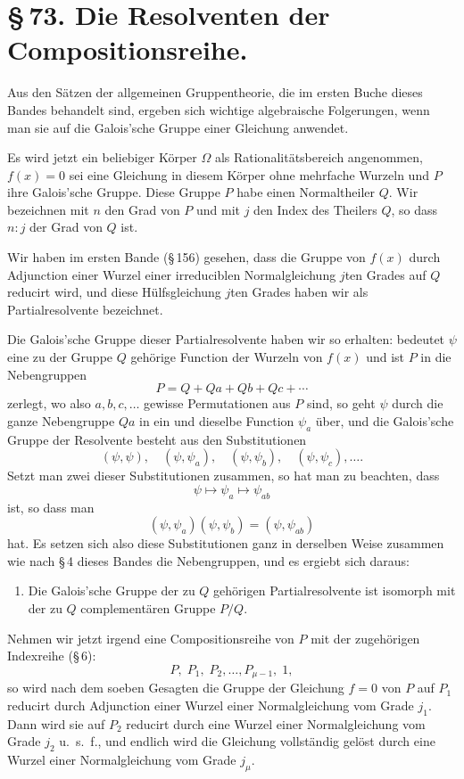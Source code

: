 \documentclass[11pt]{article}
\begin{document}
\section*{\S\,73. Die Resolventen der Compositionsreihe.}

Aus den Sätzen der allgemeinen Gruppentheorie, die im ersten Buche dieses Bandes behandelt sind, ergeben sich wichtige algebraische Folgerungen, wenn man sie auf die Galois'sche Gruppe einer Gleichung anwendet.

Es wird jetzt ein beliebiger Körper $\Omega$ als Rationalitätsbereich angenommen, $f(x)=0$ sei eine Gleichung in diesem Körper ohne mehrfache Wurzeln und $P$ ihre Galois'sche Gruppe. Diese Gruppe $P$ habe einen Normaltheiler $Q$. Wir bezeichnen mit $n$ den Grad von $P$ und mit $j$ den Index des Theilers $Q$, so dass $n:j$ der Grad von $Q$ ist.

Wir haben im ersten Bande (\S\,156) gesehen, dass die Gruppe von $f(x)$ durch Adjunction einer Wurzel einer irreduciblen Normalgleichung $j$ten Grades auf $Q$ reducirt wird, und diese Hülfsgleichung $j$ten Grades haben wir als Partialresolvente bezeichnet.

Die Galois'sche Gruppe dieser Partialresolvente haben wir so erhalten: bedeutet $\psi$ eine zu der Gruppe $Q$ gehörige Function der Wurzeln von $f(x)$ und ist $P$ in die Nebengruppen
\[
  P=Q+Qa+Qb+Qc+\cdots
\]
zerlegt, wo also $a,b,c,\ldots$ gewisse Permutationen aus $P$ sind, so geht $\psi$ durch die ganze Nebengruppe $Qa$ in ein und dieselbe Function $\psi_a$ über, und die Galois'sche Gruppe der Resolvente besteht aus den Substitutionen
\[
  (\psi,\psi),\quad(\psi,\psi_a),\quad(\psi,\psi_b),\quad(\psi,\psi_c),\ldots .
\]
Setzt man zwei dieser Substitutionen zusammen, so hat man zu beachten, dass
\[
  \psi\longmapsto \psi_a\longmapsto \psi_{ab}
\]
ist, so dass man
\[
  (\psi,\psi_a)(\psi,\psi_b)=(\psi,\psi_{ab})
\]
hat. Es setzen sich also diese Substitutionen ganz in derselben Weise zusammen wie nach \S\,4 dieses Bandes die Nebengruppen, und es ergiebt sich daraus:

\begin{enumerate}[label=\arabic*.,leftmargin=2.6em]
\item Die Galois'sche Gruppe der zu $Q$ gehörigen Partialresolvente ist isomorph mit der zu $Q$ complementären Gruppe $P/Q$.
\end{enumerate}

Nehmen wir jetzt irgend eine Compositionsreihe von $P$ mit der zugehörigen Indexreihe (\S\,6):
\begin{equation}
 P,\;P_1,\;P_2,\ldots,P_{\mu-1},\;1,
 \tag{1}
\end{equation}
so wird nach dem soeben Gesagten die Gruppe der Gleichung $f=0$ von $P$ auf $P_1$ reducirt durch Adjunction einer Wurzel einer Normalgleichung vom Grade $j_1$. Dann wird sie auf $P_2$ reducirt durch eine Wurzel einer Normalgleichung vom Grade $j_2$ u.\ s.\ f., und endlich wird die Gleichung vollständig gelöst durch eine Wurzel einer Normalgleichung vom Grade $j_\mu$.
\end{document}
